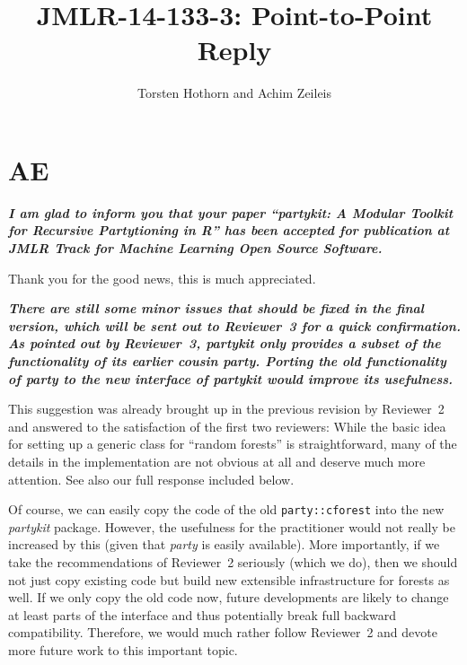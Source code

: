 \documentclass{article}
\title{JMLR-14-133-3: Point-to-Point Reply}
\author{Torsten Hothorn and Achim Zeileis}
\begin{document}
\maketitle

\section*{AE}

\textbf{\textit{%
I am glad to inform you that your paper ``partykit: A Modular Toolkit for
Recursive Partytioning in R'' has been accepted for publication at JMLR Track for Machine Learning
Open Source Software.
}}

\smallskip

Thank you for the good news, this is much appreciated.

\smallskip

\textbf{\textit{%
There are still some minor issues that should be fixed in the final version, which will
be sent out to Reviewer~3 for a quick confirmation.
As pointed out by Reviewer~3, partykit only provides a subset of the functionality of its
earlier cousin party. Porting the old functionality of party to the new
interface of partykit would improve its usefulness.}}

\smallskip

This suggestion was already brought up in the previous revision by Reviewer~2
and answered to the satisfaction of the first two reviewers: While the basic idea for
setting up a generic class for ``random forests'' is straightforward, many of the
details in the implementation are not obvious at all and deserve much more attention.
See also our full response included below.

Of course, we can easily copy the code of the old \texttt{party::cforest} into the
new \emph{partykit} package. However, the usefulness for the practitioner would not
really be increased by this (given that \emph{party} is easily available). More
importantly, if we take the recommendations of Reviewer~2 seriously (which we do),
then we should not just copy existing code but build new extensible infrastructure
for forests as well. If we only copy the old code now, future developments are likely
to change at least parts of the interface and thus potentially break full
backward compatibility. Therefore, we would much rather follow Reviewer~2 and devote
more future work to this important topic.
\end{document}
